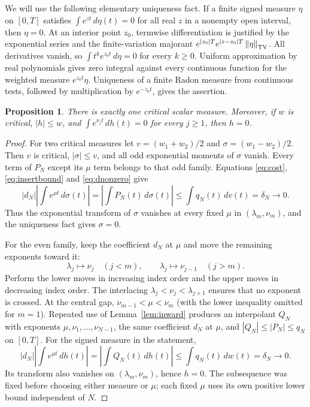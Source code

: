 \documentclass[11pt]{article}
\newtheorem{proposition}[theorem]{Proposition}
\theoremstyle{remark}
\newcommand{\norm}[1]{\left\lVert #1\right\rVert}
\newcommand{\abs}[1]{\left\lvert #1\right\rvert}
\begin{document}
We will use the following elementary uniqueness fact. If a finite signed
measure $\eta$ on $[0,T]$ satisfies
$\int e^{zt}\,d\eta(t)=0$ for all real $z$ in a nonempty open interval,
then $\eta=0$. At an interior point $z_0$, termwise differentiation is
justified by the exponential series and the finite-variation majorant
$e^{|z_0|T}e^{|z-z_0|T}\norm{\eta}_{\rm TV}$. All derivatives vanish,
so $\int t^ke^{z_0t}\,d\eta=0$ for every $k\ge0$. Uniform approximation
by real polynomials gives zero integral against every continuous function
for the weighted measure $e^{z_0t}\eta$. Uniqueness of a finite Radon
measure from continuous tests, followed by multiplication by
$e^{-z_0t}$, gives the assertion.

\begin{proposition}\label{prop:rigidity}
There is exactly one critical scalar measure. Moreover, if $w$ is critical,
$|h|\le w$, and $\int e^{\nu_jt}\,dh(t)=0$ for every $j\ge1$, then $h=0$.
\end{proposition}
\begin{proof}
For two critical measures let
$v=(w_1+w_2)/2$ and $\sigma=(w_1-w_2)/2$. Then $v$ is critical,
$|\sigma|\le v$, and all odd exponential moments of $\sigma$ vanish.
Every term of $P_N$ except its $\mu$ term belongs to that odd family.
Equations \eqref{eq:cost}, \eqref{eq:insertbound} and \eqref{eq:dnonzero}
give
\[
 |d_N|\abs{\int e^{\mu t}\,d\sigma(t)}
 =\abs{\int P_N(t)\,d\sigma(t)}
 \le\int q_N(t)\,dv(t)=\delta_N\longrightarrow0.
\]
Thus the exponential transform of $\sigma$ vanishes at every fixed $\mu$
in $(\lambda_m,\nu_m)$, and the uniqueness fact gives $\sigma=0$.

For the even family, keep the coefficient $d_N$ at $\mu$ and move the
remaining exponents toward it:
\[
 \lambda_j\mapsto\nu_j\quad(j<m),\qquad
 \lambda_j\mapsto\nu_{j-1}\quad(j>m).
\]
Perform the lower moves in increasing index order and the upper moves in
decreasing index order. The interlacing
$\lambda_j<\nu_j<\lambda_{j+1}$ ensures that no exponent is crossed.
At the central gap, $\nu_{m-1}<\mu<\nu_m$ (with the lower inequality
omitted for $m=1$). Repeated use of Lemma~\ref{lem:inward} produces an
interpolant $Q_N$ with exponents $\mu,\nu_1,\ldots,\nu_{N-1}$, the same
coefficient $d_N$ at $\mu$, and
$|Q_N|\le|P_N|\le q_N$ on $[0,T]$. For the signed measure in the
statement,
\[
 |d_N|\abs{\int e^{\mu t}\,dh(t)}
 =\abs{\int Q_N(t)\,dh(t)}
 \le\int q_N(t)\,dw(t)=\delta_N\longrightarrow0.
\]
Its transform also vanishes on $(\lambda_m,\nu_m)$, hence $h=0$.
The subsequence was fixed before choosing either measure or $\mu$; each
fixed $\mu$ uses its own positive lower bound independent of $N$.
\end{proof}
\end{document}

